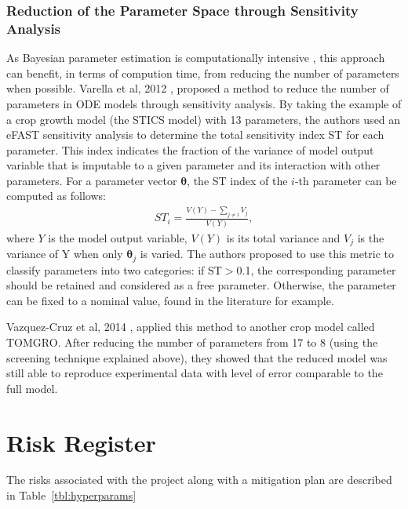 \documentclass[11pt]{article}
\begin{document}
\subsubsection{Reduction of the Parameter Space through Sensitivity Analysis}
As Bayesian parameter estimation is computationally intensive  \cite{revParamEst}, this approach can benefit, in terms of compution time, from reducing the number of parameters when possible. Varella et al, 2012 \cite{varellaEFAT}, proposed a method to reduce the number of parameters in ODE models through sensitivity analysis. By taking the example of a crop growth model (the STICS model) with 13 parameters, the authors used an eFAST sensitivity analysis to determine the total sensitivity index ST for each parameter. This index indicates the fraction of the variance of model output variable that is imputable to a given parameter and its interaction with other parameters. For a parameter vector $\boldsymbol{\theta}$, the ST index of the $i$-th parameter can be computed as follows:
\begin{align*}
    ST_i =\frac{ V(Y) - \sum_{j \neq i}V_j}{V(Y)},
\end{align*}
where $Y$ is the model output variable, $V(Y)$ is its total variance and $V_j$ is the variance of Y when only $\boldsymbol{\theta}_j$ is varied.
The authors proposed to use this metric to classify parameters into two categories: if ST$>$0.1, the corresponding parameter should be retained and considered as a free parameter. Otherwise, the parameter can be fixed to a nominal value, found in the literature for example. 

Vazquez-Cruz et al, 2014 \cite{tomgro}, applied this method to another crop model called TOMGRO. After reducing the number of parameters from 17 to 8 (using the screening technique explained above), they showed that the reduced model was still able to reproduce experimental data with level of error comparable to the full model.  

\section{Risk Register}
The risks associated with the project along with a mitigation plan are described in Table~\ref{tbl:hyperparams}
\end{document}
